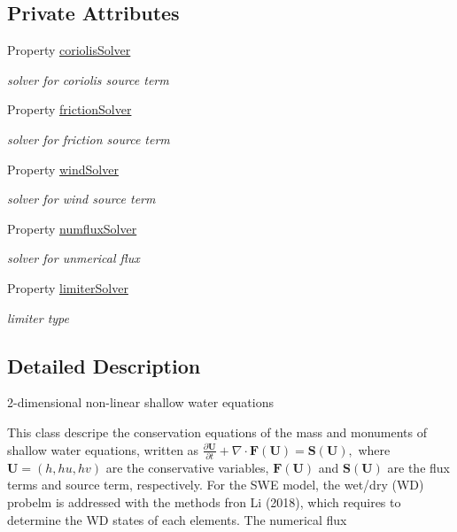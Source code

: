 \subsection*{Private Attributes}
\begin{DoxyCompactItemize}
\item 
Property \hyperlink{class_s_w_e_abstract2d_a56406c864768fe4f0893b3eacb8b8fbd}{coriolis\+Solver}
\begin{DoxyCompactList}\small\item\em solver for coriolis source term \end{DoxyCompactList}\item 
Property \hyperlink{class_s_w_e_abstract2d_ae19f76c6a0f424ddd737577908f169a7}{friction\+Solver}
\begin{DoxyCompactList}\small\item\em solver for friction source term \end{DoxyCompactList}\item 
Property \hyperlink{class_s_w_e_abstract2d_a0d9905362cee030e437e5795b31ca507}{wind\+Solver}
\begin{DoxyCompactList}\small\item\em solver for wind source term \end{DoxyCompactList}\item 
Property \hyperlink{class_s_w_e_abstract2d_adc85a44d94c753863eef5ff58209f77f}{numflux\+Solver}
\begin{DoxyCompactList}\small\item\em solver for unmerical flux \end{DoxyCompactList}\item 
Property \hyperlink{class_s_w_e_abstract2d_ad4b464b197f1bc399a3724693e34615d}{limiter\+Solver}
\begin{DoxyCompactList}\small\item\em limiter type \end{DoxyCompactList}\end{DoxyCompactItemize}


\subsection{Detailed Description}
2-\/dimensional non-\/linear shallow water equations 

This class descripe the conservation equations of the mass and monuments of shallow water equations, written as $ \frac{\partial \mathbf{U}}{\partial t} + \nabla \cdot \mathbf{F}(\mathbf{U}) = \mathbf{S}(\mathbf{U}), $ where $ \mathbf{U} = (h, hu, hv) $ are the conservative variables, $ \mathbf{F}(\mathbf{U}) $ and $ \mathbf{S}(\mathbf{U}) $ are the flux terms and source term, respectively. For the S\+WE model, the wet/dry (WD) probelm is addressed with the methods fron Li (2018), which requires to determine the WD states of each elements. The numerical flux 

